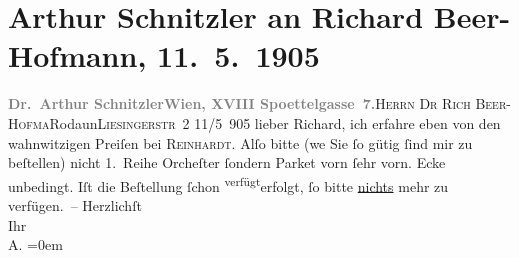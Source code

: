

         
         \renewcommand{\erwaehntePersonen}{Personen: Richard Beer-Hofmann, Max Reinhardt}
         \renewcommand{\erwaehnteOrte}{Orte: Edmund-Weiß-Gasse, Liesingerstraße, Rodaun, Wien, XVIII., Währing}
         \renewcommand{\erwaehnteWerke}{Werke: Der Graf von Charolais. Ein Trauerspiel}
               \section[Arthur Schnitzler an Richard Beer-Hofmann, 11. 5. 1905]{ Arthur Schnitzler an Richard Beer-Hofmann, 11. 5. 1905}\nopagebreak{}\rehead{ }\begin{ledgroupsized}[t]{13cm}\normalsize\beginnumbering \toendnotes[C]{\smallbreak\pagebreak[2]} 
\toendnotes[C]{\smallbreak}\pstart{}{\pb}\textcolor{gray}{\textbf{Dr. Arthur Schnitzler}}\pend{}\pstart{}\textcolor{gray}{\textbf{Wien, XVIII Spoettelgasse 7.}}\pend{}{\bigskip}\pstart{}{\pb}\textsc{Herrn Dr Rich Beer-Hofma{\geminationn}}\pend{}\pstart{}Rodaun\pend{}\pstart{}\textsc{Liesingerstr 2}\pend{}{\bigskip}\pstart
           \raggedleft{}{\pb}11/5 905\pend
           \pstart{}lieber Richard, \pend\pstart
           ich erfahre eben von den wahnwitzigen Preiſen bei \textsc{Reinhardt}. Alſo bitte (we{\geminationn} Sie ſo gütig ſind mir zu
               beſtellen) nicht 1. Reihe Orcheſter ſondern Parket vorn ſehr vorn. Ecke unbedingt.
               Iſt die Beſtellung ſchon \substVorne{}\textsuperscript{verfügt}{\allowbreak}\substDazwischen{}erfolgt\substHinten{}, ſo bitte \uline{nichts}{ }{\pb}mehr zu verfügen. –\pend
           \pstart
           Herzlichſt{\\[\baselineskip]}Ihr{\\[\baselineskip]}\spacefill\mbox{A.}\pend
           \leftskip=0em{}
         
         \endnumbering{}\end{ledgroupsized}  \newcommand{\dateiname}{L01516}\newcommand{\titel}{Arthur Schnitzler an Richard Beer-Hofmann, 11. 5. 1905}\newcommand{\editorInnen}{Martin Anton Müller und Gerd-Hermann Susen}
      